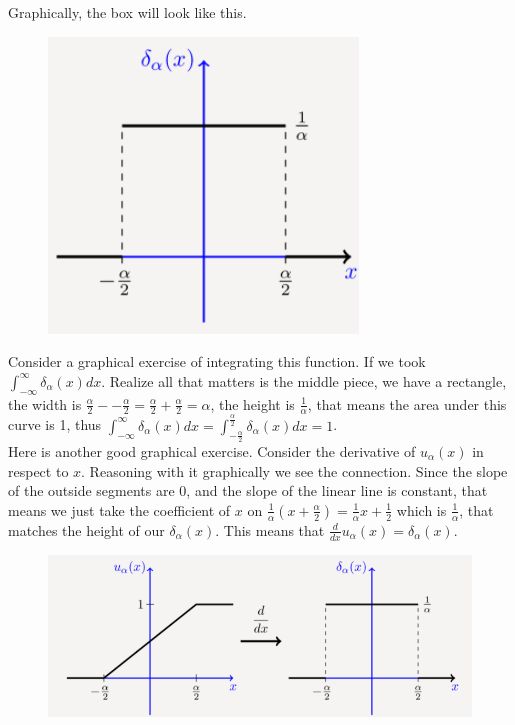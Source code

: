 \documentclass[12pt]{article}
\begin{document}
Graphically, the box will look like this. 

\pagebreak

\begin{figure}[!htbp]
\centering
\includegraphics[scale=.7]{step9.PNG}
\label{fig:hsf9}
\end{figure}

Consider a graphical exercise of integrating this function. If we took $\int_{-\infty}^{\infty} \delta_{\alpha}(x)dx$. Realize all that matters is the middle piece, we have a rectangle, the width is $\frac{\alpha}{2}--\frac{\alpha}{2}=\frac{\alpha}{2}+\frac{\alpha}{2}=\alpha$, the height is $\frac{1}{\alpha}$, that means the area under this curve is 1, thus $\int_{-\infty}^{\infty} \delta_{\alpha}(x)dx=\int_{-\frac{\alpha}{2}}^{\frac{\alpha}{2}} \delta_{\alpha}(x)dx=1$. \\

Here is another good graphical exercise. Consider the derivative of $u_{\alpha}(x)$ in respect to $x$. Reasoning with it graphically we see the connection. Since the slope of the outside segments are 0, and the slope of the linear line is constant, that means we just take the coefficient of $x$ on $\frac{1}{\alpha}\left(x+\frac{\alpha}{2}\right)=\frac{1}{\alpha}x+\frac{1}{2}$ which is $\frac{1}{\alpha}$, that matches the height of our $\delta_{\alpha}(x)$. This means that $\frac{d}{dx}u_{\alpha}(x)=\delta_{\alpha}(x)$.

\begin{figure}[!htbp]
\centering
\includegraphics[scale=.7]{step10.PNG}
\label{fig:hsf10}
\end{figure}
\end{document}
